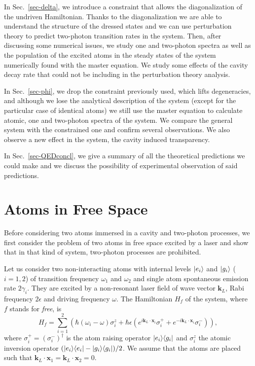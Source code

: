 In Sec.~\ref{sec-delta}, we introduce a constraint that allows the diagonalization of the undriven Hamiltonian. Thanks to the diagonalization we are able to understand the structure of the dressed states and we can use perturbation theory to predict two-photon transition rates in the system. Then, after discussing some numerical issues, we study one and two-photon spectra as well as the population of the excited atoms in the steady states of the system numerically found with the master equation. We study some effects of the cavity decay rate that could not be including in the perturbation theory analysis.

In Sec.~\ref{sec-phi}, we drop the constraint previously used, which lifts degeneracies, and although we lose the analytical description of the system (except for the particular case of identical atoms) we still use the master equation to calculate  atomic, one and two-photon spectra of the system. We compare the general system with the constrained one and confirm several observations. We also observe a new effect in the system, the cavity induced transparency.

In Sec.~\ref{sec-QEDconcl}, we give a summary of all the theoretical predictions we could make and we discuss the possibility of experimental observation of said predictions.

\section{Atoms in Free Space} \label{sec-free}

Before considering two atoms immersed in a cavity and two-photon processes, we first consider the problem of two atoms in free space excited by a laser and show that in that kind of system, two-photon processes are prohibited.

Let us consider two non-interacting atoms with internal levels $| e_i \rangle$ and $| g_i \rangle$ ($i=1,2$) of transition frequency $\omega_1$ and $\omega_2$ and single atom spontaneous emission rate $2 \gamma_i$. They are excited by a non-resonant laser field of wave vector $\mathbf k_L$, Rabi frequency $2\epsilon$ and driving frequency $\omega$. The Hamiltonian $H_f$  of the system, where $f$ stands for \emph{free}, is
\[ H_f = \sum_{i=1}^2 \left( \hbar (\omega_i-\omega) \sigma^{z}_i +   \hbar \epsilon \left(e^{i \mathbf k_L \cdot \mathbf x_i} \sigma^+_i +e^{-i \mathbf k_L \cdot \mathbf x_i} \sigma^-_i    \right) \right), \]
where $\sigma_i^+ = (\sigma_i^-)^{\dagger}$ is the atom raising operator $| e_i \rangle \langle g_i |$ and $\sigma_i^z$ the atomic inversion operator $(| e_i \rangle \langle e_i |-| g_i \rangle \langle g_i |)/2$. We assume that the atoms are placed such that $\mathbf k_L \cdot \mathbf x_1 = \mathbf k_L \cdot \mathbf x_2 = 0$.

